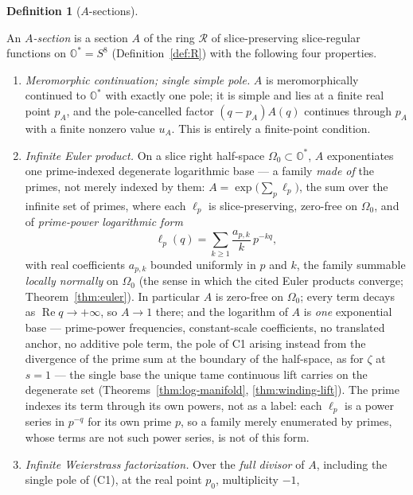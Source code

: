 \documentclass[11pt]{article}
\newcommand{\OO}{\mathbb{O}}
\DeclareMathOperator{\re}{Re}
\providecommand{\lean}[1]{}
\providecommand{\uses}[1]{}
\theoremstyle{plain}
\theoremstyle{definition}
\newtheorem{definition}[theorem]{Definition}
\theoremstyle{remark}
\begin{document}
\begin{definition}[$A$-sections]\label{def:A-section}
\lean{ASection, weierstrassE, spherePrimary}
\uses{def:R, prop:weierstrass, lem:residue-spheres}
An \emph{$A$-section} is a section $A$ of the ring $\mathcal R$ of slice-preserving
slice-regular functions on $\OO^{*}=S^8$ \textup{(Definition~\ref{def:R})} with the following
four properties.
\begin{enumerate}[label=\textup{(C\arabic*)},leftmargin=3.2em]
\item \emph{Meromorphic continuation; single simple pole.} $A$ is meromorphically continued to
  $\OO^{*}$ with exactly one pole; it is simple and lies at a finite real point $p_A$, and
  the pole-cancelled factor $(q-p_A)A(q)$ continues through $p_A$ with a finite nonzero
  value $u_A$.  This is entirely a finite-point condition.
\item \emph{Infinite Euler product.} On a slice right half-space $\Omega_0\subset\OO^{*}$,
  $A$ exponentiates one prime-indexed degenerate logarithmic base --- a family \emph{made
  of} the primes, not merely indexed by them:
  $A=\exp\!\big(\sum_{p}\ell_p\big)$, the sum over the infinite set of primes,
  where each $\ell_p$ is slice-preserving, zero-free on $\Omega_0$, and of
  \emph{prime-power logarithmic form}
  \[
    \ell_p(q)=\sum_{k\ge1}\frac{a_{p,k}}{k}\,p^{-kq},
  \]
  with real coefficients $a_{p,k}$ bounded uniformly in $p$ and $k$, the family summable
  \emph{locally normally} on $\Omega_0$ \textup{(}the sense in which the cited Euler products
  converge; Theorem~\ref{thm:euler}\textup{)}. In particular $A$ is zero-free on $\Omega_0$;
  every term decays as $\re q\to+\infty$, so $A\to1$ there; and the logarithm of $A$ is \emph{one} exponential base
  --- prime-power frequencies, constant-scale coefficients, no translated anchor, no additive
  pole term, the pole of \textup{C1} arising instead from the divergence of the prime sum at
  the boundary of the half-space, as for $\zeta$ at $s=1$ --- the single base the unique tame
  continuous lift carries on the degenerate set (Theorems~\ref{thm:log-manifold},
  \ref{thm:winding-lift}). The prime indexes its term through its own powers, not as a label:
  each $\ell_p$ is a power series in $p^{-q}$ for its own prime $p$, so a family merely
  enumerated by primes, whose terms are not such power series, is not of this form.
\item \emph{Infinite Weierstrass factorization.} Over the \emph{full divisor} of $A$,
  including the single pole of \textup{(C1)}, at the real point $p_0$, multiplicity $-1$,

\end{enumerate}
\end{definition}
\end{document}
